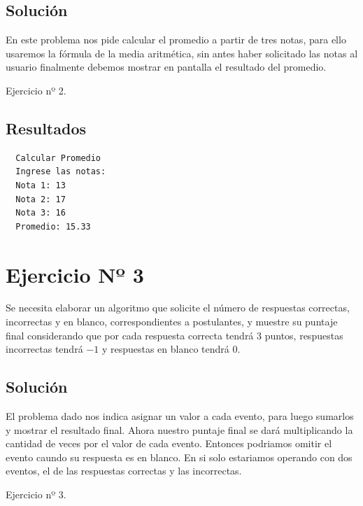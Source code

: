 \subsection{Solución}
En este problema nos pide calcular el promedio a partir de tres notas, para
ello usaremos la fórmula de la media aritmética, sin antes haber solicitado las
notas al usuario finalmente debemos mostrar en pantalla el resultado del
promedio.
\begin{longlisting}
	\caption{Ejercicio nº 2.}\label{cod:ex_2}
\end{longlisting}
\subsection{Resultados}
\begin{verbatim}
  Calcular Promedio 
  Ingrese las notas:
  Nota 1: 13
  Nota 2: 17
  Nota 3: 16
  Promedio: 15.33
\end{verbatim}
\section{Ejercicio Nº 3}
Se necesita elaborar un algoritmo que solicite el número de respuestas
correctas, incorrectas y en blanco, correspondientes a postulantes, y muestre
su puntaje final considerando que por cada respuesta correcta tendrá $3$
puntos, respuestas incorrectas tendrá $-1$ y respuestas en blanco tendrá $0$.
\subsection{Solución}
El problema dado nos indica asignar un valor a cada evento, para luego sumarlos
y mostrar el resultado final. Ahora nuestro puntaje final se dará multiplicando
la cantidad de veces por el valor de cada evento. Entonces podriamos omitir el
evento caundo su respuesta es en blanco. En si solo estariamos operando con dos
eventos, el de las respuestas correctas y las incorrectas. \vspace{8mm}
\begin{longlisting}
	\caption{Ejercicio nº 3.}\label{cod:ex_3}
\end{longlisting}
